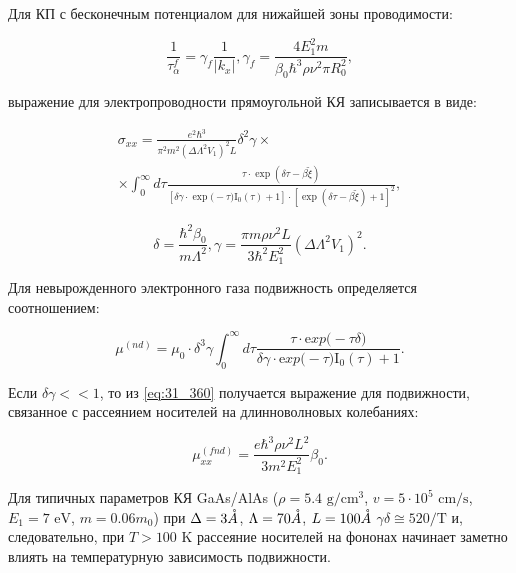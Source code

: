 Для КП с бесконечным потенциалом для нижайшей зоны проводимости:

\begin{equation} \label{eq:31_340}
\frac{1}{\tau _{\alpha }^{f} } =\gamma _{f} \frac{1}{\left|k_{x} \right|} , \gamma _{f} =\frac{4E_{1}^{2} m}{\beta _{0} \hbar ^{3} \rho \nu ^{2} \pi R_{0}^{2} },
\end{equation}
 
\noindent выражение для электропроводности прямоугольной КЯ записывается в виде:

\begin{multline} \label{eq:31_350}
\sigma _{xx} =\frac{e^{2} \hbar ^{3} }{\pi ^{2} m^{2} \left(\Delta \Lambda ^{2} V_{1} \right)^{2} L} \delta ^{2} \gamma \times \\
 \times \int _{0}^{\infty }d\tau \frac{\tau \cdot {\exp}\left(\delta \tau -\beta \tilde{\xi }\right)}{\left[\delta \gamma \cdot {\exp(}-\tau ){\mathrm I}_{{\mathrm 0}} (\tau )+1\right]\cdot \left[{\exp}\left(\delta \tau -\beta \tilde{\xi }\right)+1\right]^{2} },
\end{multline}
  
\[
\delta =\frac{\hbar ^{2} \beta _{0} }{m\Lambda ^{2} } , \gamma =\frac{\pi m\rho \nu ^{2} L}{3\hbar ^{2} E_{1}^{2} } \left(\Delta \Lambda ^{2} V_{1} \right)^{2} .
\]
 
Для невырожденного электронного газа подвижность определяется соотношением:

\begin{equation} \label{eq:31_360}
\mu ^{(nd)} =\mu _{0} \cdot \delta ^{3} \gamma \int _{0}^{\infty }d\tau \frac{\tau \cdot {\mathrm exp(}-\tau \delta )}{\delta \gamma \cdot {\mathrm exp(}-\tau ){\mathrm I}_{{\mathrm 0}} (\tau )+1}. 
\end{equation}

Если $\delta \gamma <<1$, то из \eqref{eq:31_360} получается выражение для подвижности, связанное с рассеянием носителей на длинноволновых колебаниях:

\begin{equation} \label{eq:31_370}
\mu _{xx}^{(fnd)} =\frac{e\hbar ^{3} \rho \nu ^{2} L^{2} }{3m^{2} E_{1}^{2} } \beta _{0}. 
\end{equation}

Для типичных параметров КЯ GaAs/AlAs ($\rho =5.4 \text{ g} / \text{cm}^3 $, $v=5\cdot 10^{5} \text{ cm/s}$, $E_{1} =7 \text{  eV}$, $m=0.06m_{0} $) при $\Delta =3 \AA$, $\Lambda =70 \AA$, $L = 100 \AA$  $\gamma \delta \cong 520/\text{T}$ и, следовательно, при $T>100\text{ K}$ рассеяние носителей на фононах начинает заметно влиять на температурную зависимость подвижности.

